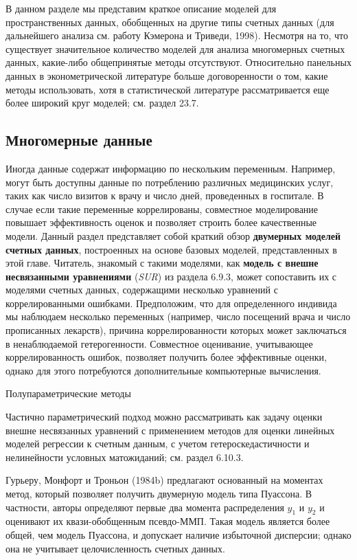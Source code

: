 \noindent
В данном разделе мы представим краткое описание моделей для пространственных данных, обобщенных на другие типы счетных данных (для дальнейшего анализа см. работу Кэмерона и Триведи, 1998). Несмотря на то, что существует значительное количество моделей для анализа многомерных счетных данных, какие-либо общепринятые методы отсутствуют. Относительно панельных данных в эконометрической литературе больше договоренности о том, какие методы использовать, хотя в статистической литературе рассматривается еще более широкий круг моделей; см. раздел 23.7.


\subsection{Многомерные данные}\label{sec:20.6.1}

\noindent
Иногда данные содержат информацию по нескольким переменным. Например, могут быть доступны данные по потреблению различных медицинских услуг, таких как число визитов к врачу и число дней, проведенных в госпитале. В случае если такие переменные коррелированы, совместное моделирование повышает эффективность оценок и позволяет строить более качественные модели. Данный раздел представляет собой краткий обзор \textbf{двумерных моделей счетных данных}, построенных на основе базовых моделей, представленных в этой главе. Читатель, знакомый с такими моделями, как \textbf{модель с внешне несвязанными уравнениями} (\textit{SUR}) из раздела 6.9.3, может сопоставить их с моделями счетных данных, содержащими несколько уравнений с коррелированными ошибками. Предположим, что для определенного индивида мы наблюдаем несколько переменных (например, число посещений врача и число прописанных лекарств), причина коррелированности которых может заключаться в ненаблюдаемой гетерогенности. Совместное оценивание, учитывающее коррелированность ошибок, позволяет получить более эффективные оценки, однако для этого потребуются дополнительные компьютерные вычисления.

        \begin{center}{Полупараметрические методы}\end{center}
        \noindent
Частично параметрический подход можно рассматривать как задачу оценки внешне несвязанных уравнений с применением методов для оценки линейных моделей регрессии к счетным данным, с учетом гетероскедастичности и нелинейности условных матожиданий; см. раздел 6.10.3.

Гурьеру, Монфорт и Троньон (1984b) предлагают основанный на моментах метод, который позволяет получить двумерную модель типа Пуассона. В частности, авторы определяют первые два момента распределения $y_1$ и $y_2$ и оценивают их квази-обобщенным псевдо-ММП. Такая модель является более общей, чем модель Пуассона, и допускает наличие избыточной дисперсии; однако она не учитывает целочисленность счетных данных.

